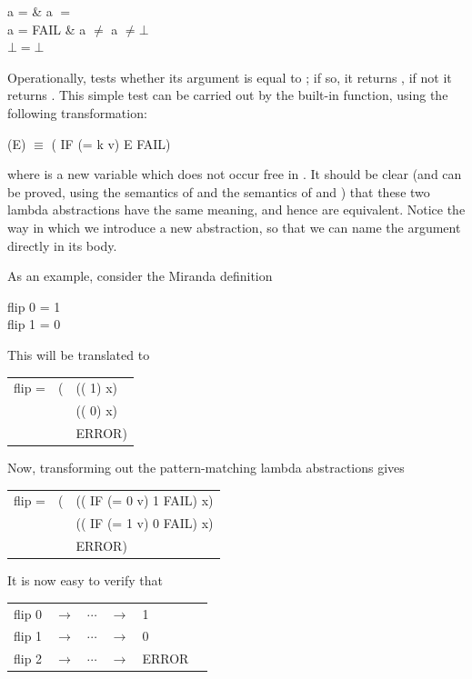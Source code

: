 \begin{letalign}
 a =  \qquad &  a $=$ \\
 a = FAIL & a $\neq$    a $\neq \bot$  \\
 $\bot = \bot$
\end{letalign}
Operationally,  tests whether its argument is equal to ; if so, it returns
, if not it returns . This simple test can be carried out by the built-in 
function, using the following transformation:
\begin{mlcoded}
(E) $\equiv$ (   IF (= k v) E FAIL)
\end{mlcoded}
where  is a new variable which does not occur free in . It should be clear
(and can be proved, using the semantics of   and the semantics of  and
\ml{=}) that these two lambda abstractions have the same meaning, and hence are
equivalent. Notice the way in which we introduce a new  abstraction, so that
we can name the argument directly in its body.

As an example, consider the Miranda definition
\begin{mlcoded}
flip 0 = 1\\
flip 1 = 0
\end{mlcoded}
This will be translated to
\begin{mlcoded}
	\begin{tabular}{lll}
		flip = \tlb{x} &( &((\tlb{0} 1) x) \\
		& \fatbar{}  &((\tlb{1} 0) x) \\
		& \fatbar{} &ERROR)
	\end{tabular}
\end{mlcoded}
Now, transforming out the pattern-matching lambda abstractions gives
\begin{mlcoded}
	\begin{tabular}{lll}
		flip = \tlb{x} &( &((\tlb{v} IF (= 0 v) 1 FAIL) x) \\
		& \fatbar{}  &((\tlb{v} IF (= 1 v) 0 FAIL) x) \\
		& \fatbar{} &ERROR)
	\end{tabular}
\end{mlcoded}
It is now easy to verify that
\begin{mlcoded}
\begin{tabular}{llllll}
flip 0 & $\to$ & $\cdots$ & $\to$ & 1 \\
flip 1 & $\to$ & $\cdots$ & $\to$ & 0 \\
flip 2 & $\to$ & $\cdots$ & $\to$ & ERROR \\
\end{tabular}
\end{mlcoded}

